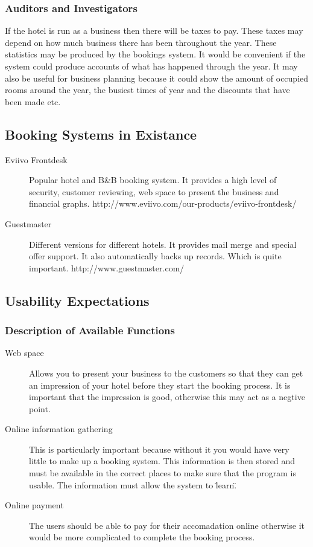 \documentclass[12pt]{article}
\begin{document}
\subsubsection{Auditors and Investigators}
If the hotel is run as a business then there will be taxes to pay. These taxes
may depend on how much business there has been throughout the year. These 
statistics may be produced by the bookings system. It would be convenient
if the system could produce accounts of what has happened through the year.
It may also be useful for business planning because it could show the amount
of occupied rooms around the year, the busiest times of year and the discounts
that have been made etc.

\subsection{Booking Systems in Existance}
\begin{description}
	\item[Eviivo Frontdesk] Popular hotel and B\&B booking system. 
		It provides a high level of security, customer reviewing,
		web space to present the business and financial graphs. 
		http://www.eviivo.com/our-products/eviivo-frontdesk/
	\item[Guestmaster] Different versions for different hotels.
		It provides mail merge and special offer support. It also
		automatically backs up records. Which is quite important.
		http://www.guestmaster.com/
\end{description}

\subsection{Usability Expectations}
\subsubsection{Description of Available Functions}
\begin{description}
	\item[Web space] Allows you to present your business to the
		customers so that they can get an impression of your hotel
		before they start the booking process. It is important that
		the impression is good, otherwise this may act as a negtive
		point.
	\item[Online information gathering] This is particularly important
		because without it you would have very little to make up a
		booking system. This information is then stored and must be
		available in the correct places to make sure that the
		program is usable. The information must allow the system
		to \"learn\".
	\item[Online payment] The users should be able to pay for their
		accomadation online otherwise it would be more complicated
		to complete the booking process.
	\item[]
\end{description}
\end{document}
